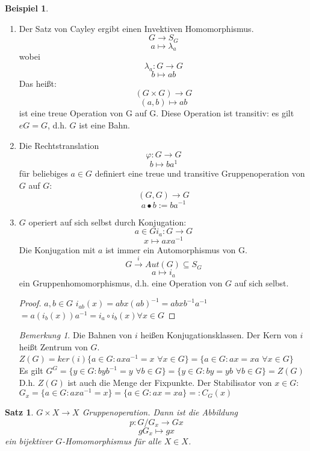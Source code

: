\documentclass[12pt]{scrartcl}%
\newtheorem{thm}{Satz}
\theoremstyle{definition}
\newtheorem{ex}{Beispiel}
\theoremstyle{remark}
\newtheorem*{nb}{Bemerkung}
\begin{document}
	\begin{ex}
	\begin{enumerate}
		\item Der Satz von Cayley ergibt einen Invektiven Homomorphismus.
		$$G \to S_G$$
		$$a \mapsto \lambda_a$$
		wobei
		$$\lambda_a: G \to G$$
		$$b \mapsto ab$$
		Das heißt: 
		$$(G\times G) \to G$$
		$$(a,b) \mapsto ab$$
		ist eine treue Operation von G auf G.
		Diese Operation ist transitiv: es gilt $eG=G$, d.h. $G$ ist eine Bahn.
		
		\item Die Rechtstranslation
		$$\varphi : G \to G$$
		$$b \mapsto ba^{1}$$
		für beliebiges $a\in G$ definiert eine treue und transitive Gruppenoperation von $G$ auf $G$:
		$$(G,G) \rightarrow G$$
		$$a \bullet b := ba^{-1}$$	
		
		\item $G$ operiert auf sich selbst durch Konjugation:
		$$a \in G i_a : G \to G$$
		$$x \mapsto axa^{-1}$$	
		Die Konjugation mit $a$ ist immer ein Automorphismus von G.
		$$G \xrightarrow{i} Aut(G) \subseteq S_G$$
		$$a \mapsto i_a$$
		ein Gruppenhomomorphismus, d.h. eine Operation von $G$ auf sich selbst.
		\begin{proof}
		$a,b \in G$ $i_{ab}(x)=abx(ab)^{-1}=abxb^{-1}a^{-1}$\\
		$=a(i_b(x))a^{-1}=i_a\circ i_b(x) \forall x\in G$
		\end{proof}
		\begin{nb}
		Die Bahnen von $i$ heißen Konjugationsklassen. Der Kern von $i$ heißt Zentrum von $G$.\\
		$Z(G)=ker(i)\{ a \in G : axa^{-1}=x$ $\forall x \in G\} = \{a \in G : ax =xa$ $\forall x \in G\}$\\
		Es gilt $G^G=\{ y \in G : byb^{-1}=y$ $\forall b \in G\}=\{ y \in G : by =yb$ $\forall b \in G\}=Z(G)$\\
		
		D.h. $Z(G)$ ist auch die Menge der Fixpunkte. Der Stabilisator von $x \in G$:\\
		$G_x=\{a \in G : axa^{-1}=x\}=\{ a \in G : ax = xa\}=:C_G(x)$
		\end{nb}		
	\end{enumerate}
	\end{ex}
	
	\begin{thm}
	$G \times X \rightarrow X$ Gruppenoperation. Dann ist die Abbildung
	$$p: G/G_x \to Gx$$
	$$gG_x \mapsto gx$$
	ein bijektiver $G$-Homomorphismus für alle $X \in X$.
	\end{thm}
	
\end{document}
